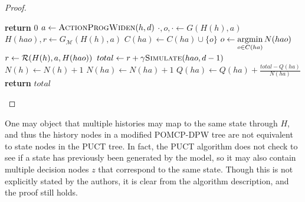 \begin{proof}
\begin{algorithm}[htb]
\begin{algorithmic}[1]
                \State \textbf{return} $0$
            \EndIf
            \State $a \gets \Call{ActionProgWiden}{h, d}$
                \State $\cdot, o, \cdot \gets G(H(h), a)$
                \State $H(hao),r \gets G_\mathcal{M}(H(h),a)$
                \State $C(ha) \gets C(ha) \cup \{o\}$
            \Else
                \State $o \gets \underset{o \in C(ha)}{\argmin}\, N(hao)$
                \State $r \gets \mathcal{R}(H(h), a, H(hao))$
            \EndIf
            \State $total \gets r + \gamma \Call{Simulate}{hao, d-1}$
            \State $N(h) \gets N(h)+1$
            \State $N(ha) \gets N(ha)+1$
            \State $Q(ha) \gets Q(ha) + \frac{total - Q(ha)}{N(ha)}$
            \State \textbf{return} $total$
        \EndProcedure
    \end{algorithmic}
\end{algorithm}

\end{proof}

\begin{remark}
    One may object that multiple histories may map to the same state through $H$, and thus the history nodes in a modified POMCP-DPW tree are not equivalent to state nodes in the PUCT tree. In fact, the PUCT algorithm does not check to see if a state has previously been generated by the model, so it may also contain multiple decision nodes $z$ that correspond to the same state. Though this is not explicitly stated by the authors, it is clear from the algorithm description, and the proof still holds.
\end{remark}
